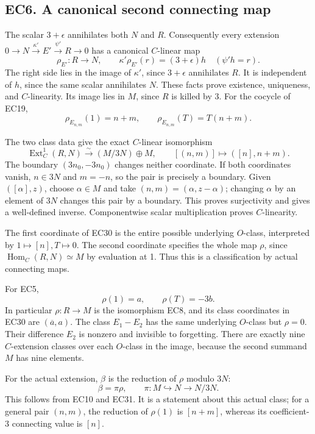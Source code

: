 \documentclass[
  10pt,
]{article}
\begin{document}
\subsection{EC6. A canonical second connecting
map}\label{ec6.-a-canonical-second-connecting-map}

The scalar \(3+\epsilon\) annihilates both \(N\) and \(R\). Consequently
every extension
\(0\to N\xrightarrow{\kappa'}E'\xrightarrow{\psi'}R\to0\) has a
canonical \(C\)-linear map \[
\rho_{E'}:R\longrightarrow N,\qquad
\kappa'\rho_{E'}(r)=(3+\epsilon)h
\quad(\psi'h=r).
\tag{EC28}
\] The right side lies in the image of \(\kappa'\), since \(3+\epsilon\)
annihilates \(R\). It is independent of \(h\), since the same scalar
annihilates \(N\). These facts prove existence, uniqueness, and
\(C\)-linearity. Its image lies in \(M\), since \(R\) is killed by 3.
For the cocycle of EC19, \[
\rho_{E_{n,m}}(1)=n+m,\qquad
\rho_{E_{n,m}}(T)=T(n+m).
\tag{EC29}
\]

The two class data give the exact \(C\)-linear isomorphism \[
\boxed{
\operatorname{Ext}^1_C(R,N)
\xrightarrow{\sim}(M/3N)\oplus M,\qquad
[(n,m)]\longmapsto([n],n+m).}
\tag{EC30}
\] The boundary \((3n_0,-3n_0)\) changes neither coordinate. If both
coordinates vanish, \(n\in3N\) and \(m=-n\), so the pair is precisely a
boundary. Given \(([\alpha],z)\), choose \(\alpha\in M\) and take
\((n,m)=(\alpha,z-\alpha)\); changing \(\alpha\) by an element of \(3N\)
changes this pair by a boundary. This proves surjectivity and gives a
well-defined inverse. Componentwise scalar multiplication proves
\(C\)-linearity.

The first coordinate of EC30 is the entire possible underlying
\(O\)-class, interpreted by \(1\mapsto[n],T\mapsto0\). The second
coordinate specifies the whole map \(\rho\), since
\(\operatorname{Hom}_C(R,N)\simeq M\) by evaluation at 1. Thus this is a
classification by actual connecting maps.

For EC5, \[
\rho(1)=a,\qquad \rho(T)=-3b.
\tag{EC31}
\] In particular \(\rho:R\to M\) is the isomorphism EC8, and its class
coordinates in EC30 are \((\overline a,a)\). The class \(E_1-E_2\) has
the same underlying \(O\)-class but \(\rho=0\). Their difference \(E_2\)
is nonzero and invisible to forgetting. There are exactly nine
\(C\)-extension classes over each \(O\)-class in the image, because the
second summand \(M\) has nine elements.

For the actual extension, \(\beta\) is the reduction of \(\rho\) modulo
\(3N\): \[
\beta=\pi\rho,\qquad \pi:M\hookrightarrow N\to N/3N.
\tag{EC32}
\] This follows from EC10 and EC31. It is a statement about this actual
class; for a general pair \((n,m)\), the reduction of \(\rho(1)\) is
\([n+m]\), whereas its coefficient-3 connecting value is \([n]\).
\end{document}
